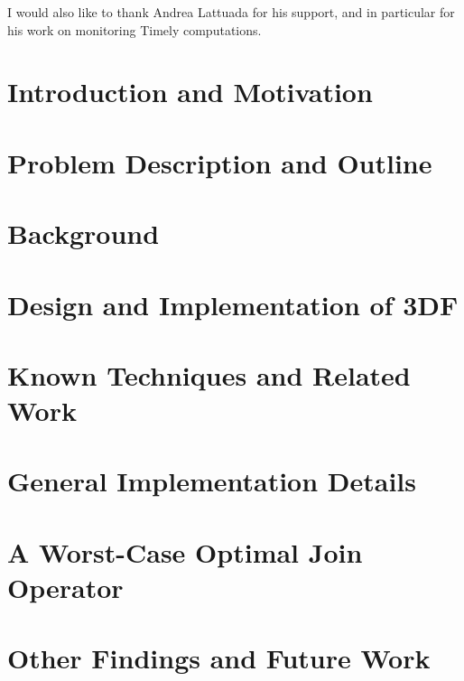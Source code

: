 \documentclass{article}
\begin{document}
I would also like to thank Andrea Lattuada for his support, and in
particular for his work on monitoring Timely computations.

\newpage

\section{Introduction and Motivation} \label{intro}

\newpage

\section{Problem Description and Outline} \label{problem}

\newpage

\section{Background} \label{background}

\newpage

\section{Design and Implementation of 3DF} \label{3df}

\newpage

\section{Known Techniques and Related Work} \label{known-techniques}

\newpage



\section{General Implementation Details} \label{implementation}

\newpage

\section{A Worst-Case Optimal Join Operator} \label{impl-hector}

\newpage

\section{Other Findings and Future Work} \label{future-work}

\newpage
\end{document}

